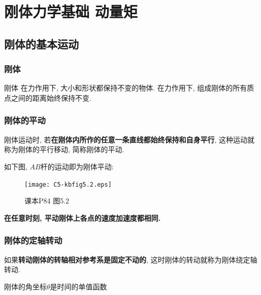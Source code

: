 \chapter{刚体力学基础 \quad 动量矩}

\begin{introduction}
	\item {}
	\item {}
	\item {}
	\item {}
	\item {}
\end{introduction}

\section{刚体的基本运动} \label{5.1}

\subsection{刚体}

\begin{definition}[刚体] \label{C5-df1}
	{\heiti 刚体} 在力作用下, 大小和形状都保持不变的物体. 在力作用下, 组成刚体的所有质点之间的距离始终保持不变. 
\end{definition}

\subsection{刚体的平动}

刚体运动时, 若\textbf{在刚体内所作的任意一条直线都始终保持和自身平行}, 这种运动就称为刚体的平行移动, 简称刚体的平动. 

如下图, $AB$杆的运动即为刚体平动: 

\begin{figure}[htbp]
	\centering
	\texttt{[image: C5-kbfig5.2.eps]}
	\caption{课本P84 图5.2}
\end{figure}

\textbf{在任意时刻, 平动刚体上各点的速度加速度都相同. }

\subsection{刚体的定轴转动}

如果\textbf{转动刚体的转轴相对参考系是固定不动的}, 这时刚体的转动就称为刚体绕定轴转动. 

刚体的角坐标$\theta$是时间的单值函数

